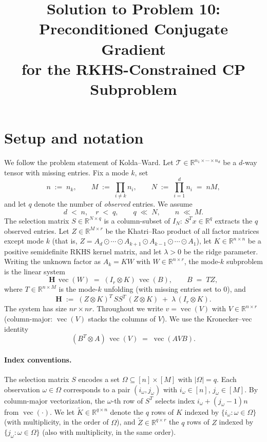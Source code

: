 \documentclass[12pt]{article}
\title{Solution to Problem 10: Preconditioned Conjugate Gradient \\
       for the RKHS-Constrained CP Subproblem}
\author{}
\date{}
\theoremstyle{definition}
\newcommand{\vecop}{\operatorname{vec}}
\newcommand{\R}{\mathbb{R}}
\newcommand{\Kt}{\widetilde{K}}
\newcommand{\Zt}{\widetilde{Z}}
\begin{document}
\maketitle

\section*{Setup and notation}

We follow the problem statement of Kolda--Ward. Let $\mathcal{T}\in\R^{n_1\times\cdots\times n_d}$
be a $d$-way tensor with missing entries. Fix a mode $k$, set
\[
n \;:=\; n_k,\qquad
M \;:=\; \prod_{i\neq k} n_i,\qquad
N \;:=\; \prod_{i=1}^d n_i \;=\; nM,
\]
and let $q$ denote the number of \emph{observed} entries. We assume
\begin{equation}\label{eq:size-assump}
d \;<\; n,\quad r \;<\; q,\qquad q \;\ll\; N,\qquad n \;\ll\; M.
\end{equation}
The selection matrix $S\in\R^{N\times q}$ is a column-subset of $I_N$: $S^T x\in\R^q$ extracts
the $q$ observed entries. Let $Z\in\R^{M\times r}$ be the Khatri--Rao product of all factor
matrices except mode $k$ (that is, $Z=A_d\odot\cdots\odot A_{k+1}\odot A_{k-1}\odot\cdots\odot A_1$),
let $K\in\R^{n\times n}$ be a positive semidefinite RKHS kernel matrix, and let $\lambda>0$ be the
ridge parameter. Writing the unknown factor as $A_k=KW$ with $W\in\R^{n\times r}$, the
mode-$k$ subproblem is the linear system
\begin{equation}\label{eq:main-system}
\mathbf{H}\,\vecop(W) \;=\; (I_r\otimes K)\,\vecop(B),\qquad
B \;=\; T Z,
\end{equation}
where $T\in\R^{n\times M}$ is the mode-$k$ unfolding (with missing entries set to $0$), and
\begin{equation}\label{eq:H-def}
\mathbf{H} \;:=\; (Z\otimes K)^T\,SS^T\,(Z\otimes K) \;+\; \lambda\,(I_r\otimes K).
\end{equation}
The system has size $nr\times nr$. Throughout we write $v=\vecop(V)$ with $V\in\R^{n\times r}$
(column-major: $\vecop(V)$ stacks the columns of $V$).
We use the Kronecker--vec identity
\begin{equation}\label{eq:kron-vec}
(B^T\otimes A)\,\vecop(V) \;=\; \vecop(A V B).
\end{equation}

\paragraph{Index conventions.}
The selection matrix $S$ encodes a set $\Omega\subseteq[n]\times[M]$ with $|\Omega|=q$.
Each observation $\omega\in\Omega$ corresponds to a pair $(i_\omega,j_\omega)$ with
$i_\omega\in[n]$, $j_\omega\in[M]$. By column-major vectorization, the $\omega$-th row of
$S^T$ selects index $i_\omega+(j_\omega-1)n$ from $\vecop(\cdot)$. We let $\Kt\in\R^{q\times n}$
denote the $q$ rows of $K$ indexed by $\{i_\omega:\omega\in\Omega\}$ (with multiplicity, in the
order of $\Omega$), and $\Zt\in\R^{q\times r}$ the $q$ rows of $Z$ indexed by
$\{j_\omega:\omega\in\Omega\}$ (also with multiplicity, in the same order).
\end{document}
